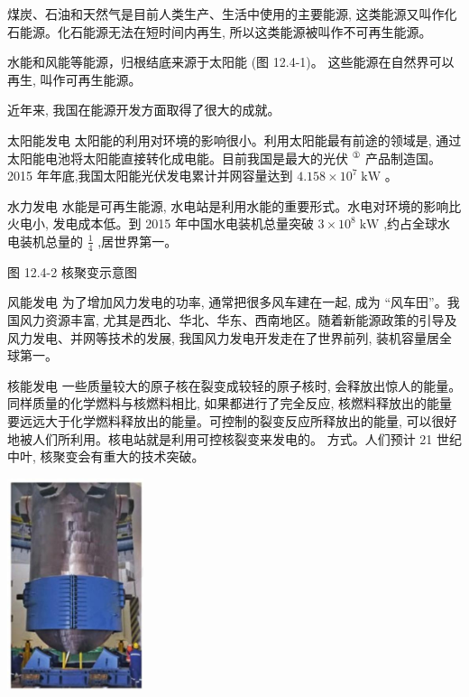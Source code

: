 \documentclass[10pt]{article}
\begin{document}
煤炭、石油和天然气是目前人类生产、生活中使用的主要能源, 这类能源又叫作化石能源。化石能源无法在短时间内再生, 所以这类能源被叫作不可再生能源。

水能和风能等能源，归根结底来源于太阳能 (图 12.4-1)。 这些能源在自然界可以再生, 叫作可再生能源。

近年来, 我国在能源开发方面取得了很大的成就。

太阳能发电 太阳能的利用对环境的影响很小。利用太阳能最有前途的领域是, 通过太阳能电池将太阳能直接转化成电能。目前我国是最大的光伏 \({}^{\text{①}}\) 产品制造国。2015 年年底,我国太阳能光伏发电累计并网容量达到 \({4.158} \times {10}^{7}\mathrm{\;{kW}}\) 。

水力发电 水能是可再生能源, 水电站是利用水能的重要形式。水电对环境的影响比火电小, 发电成本低。到 2015 年中国水电装机总量突破 \(3 \times {10}^{8}\mathrm{\;{kW}}\) ,约占全球水电装机总量的 \(\frac{1}{4}\) ,居世界第一。

\begin{mdframed}

图 12.4-2 核聚变示意图

\end{mdframed}

风能发电 为了增加风力发电的功率, 通常把很多风车建在一起, 成为 “风车田”。我国风力资源丰富, 尤其是西北、华北、华东、西南地区。随着新能源政策的引导及风力发电、并网等技术的发展, 我国风力发电开发走在了世界前列, 装机容量居全球第一。

核能发电 一些质量较大的原子核在裂变成较轻的原子核时, 会释放出惊人的能量。同样质量的化学燃料与核燃料相比, 如果都进行了完全反应, 核燃料释放出的能量要远远大于化学燃料释放出的能量。可控制的裂变反应所释放出的能量, 可以很好地被人们所利用。核电站就是利用可控核裂变来发电的。 方式。人们预计 21 世纪中叶, 核聚变会有重大的技术突破。

\begin{center}
\includegraphics[max width=0.3\textwidth]{images/01911d5f-8e38-70c0-b5b8-2b399bd115b6_101_256836.jpg}
\end{center}
\end{document}

